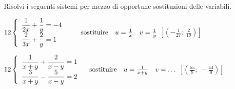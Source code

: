 \begin{esercizio}[*]
 \label{ese:22.64}
 Risolvi i seguenti sistemi per mezzo di opportune sostituzioni delle 
variabili.

\begin{enumeratea}
\item \(\arraystretch{2}\left\{\begin{array}{l}
\dfrac{1}{2x}+\dfrac{1}{y}=-4\\\dfrac{2}{3x}+\dfrac{2}{y}=1
\end{array}\right. 
\qquad \text{sostituire} \quad u=\frac{1}{x} \quad v=\frac{1}{y}\)
\hfill \(\left[\left(-{\frac{1}{27}};~\frac{2}{19}\right)\right]\)


\item \(\arraystretch{2}\left\{\begin{array}{l}
\dfrac{1}{x+y}+\dfrac{2}{x-y}=1\\\dfrac{3}{x+y}-\dfrac{5}{x-y}=2
\end{array}\right. 
\quad \text{sostituire} \quad u=\frac{1}{x+y} \quad v=\ldots\)
\hfill \(\left[\left(\frac{55}{9};~-\frac{44}{9}\right)\right]\)

\end{enumeratea}
\end{esercizio}

